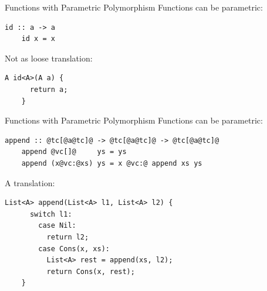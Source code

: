 \documentclass[xcolor={usenames,dvipsnames}]{beamer}
\begin{document}
%

\begin{frame}[fragile]{Functions with Parametric Polymorphism}
  Functions can be parametric:
  \begin{lstlisting}[style=hask]
    id :: a -> a
    id x = x
  \end{lstlisting}

  \pause
  Not as loose translation:
  \begin{lstlisting}[style=hask]
    A id<A>(A a) {
      return a;
    }
  \end{lstlisting}
\end{frame}

\begin{frame}[fragile]{Functions with Parametric Polymorphism}
  Functions can be parametric:
  \begin{lstlisting}[style=hask]
    append :: @tc[@a@tc]@ -> @tc[@a@tc]@ -> @tc[@a@tc]@
    append @vc[]@     ys = ys
    append (x@vc:@xs) ys = x @vc:@ append xs ys
  \end{lstlisting}

  \pause
  A translation:
  \begin{lstlisting}[style=hask]
    List<A> append(List<A> l1, List<A> l2) {
      switch l1:
        case Nil:
          return l2;
        case Cons(x, xs):
          List<A> rest = append(xs, l2);
          return Cons(x, rest);
    }
  \end{lstlisting}
\end{frame}
\end{document}

